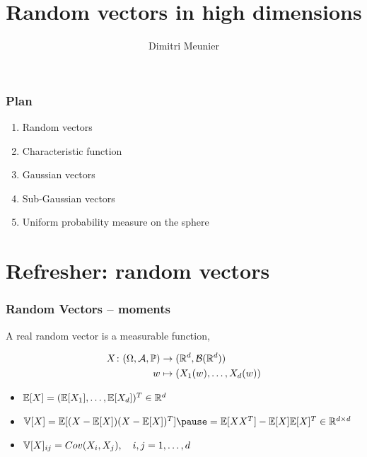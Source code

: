 \documentclass[10pt]{beamer}
\title{Random vectors in high dimensions}
\author{Dimitri Meunier}
\institute{IIT}
\begin{document}
\maketitle

\begin{frame}
  \frametitle{Plan}

  \begin{enumerate}
  \item Random vectors
    \pause
  \item Characteristic function
    \pause
  \item Gaussian vectors
    \pause
  \item Sub-Gaussian vectors
    \pause
  \item Uniform probability measure on the sphere
  \end{enumerate}
\end{frame}



  \section{Refresher: random vectors}

  \begin{frame}
    \frametitle{Random Vectors -- moments}

    A real random vector is a measurable function,

    \begin{align*}
      X \colon (\Omega,\mathcal{A},\mathbb{P}) &\to  (\mathbb{R}^{d},\mathcal{B}(\mathbb{R}^{d}))\\
      w &\mapsto (X_1(w), \ldots, X_d(w))
    \end{align*}

    \pause

    \begin{itemize}
    \item $\mathbb{E}[X] = (\mathbb{E}[X_1], \ldots, \mathbb{E}[X_d])^T \in \mathbb{R}^{d}$
      \pause
      
    \item $\V[X] = \E[(X-\E[X])(X-\E[X])^T] \pause =  \E[XX^T] - \E[X]\E[X]^T \in
      \R^{d\times d}$
      \pause
    \item $\mathbb{V}[X]_{ij} = Cov(X_i,X_j), \quad  i,j=1,\ldots,d$        
    \end{itemize}
  \end{frame}

\end{document}
